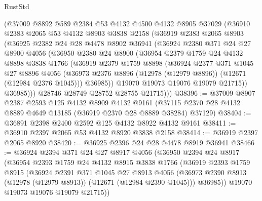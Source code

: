 \begin{lexlean}{RustStd}
\begin{coremodule}
      (@37009
        @8892
        @589
        @2384
        @53
        @4132
        @4500
        @4132
        @8905
        @37029
        (@36910
          @2383
          @2065
          @53
          @4132
          @8903
          @3838
          @2158
          (@36919
            @2383
            @2065
            @8903
            (@36925
              @2382
              @24
              @28
              @4478
              @8902
              @36941
              (@36924
                @2380
                @371
                @24
                @27
                @8900
                @4056
                (@36950
                  @2380
                  @24
                  @8900
                  (@36954
                    @2379
                    @1759
                    @24
                    @4132
                    @8898
                    @3838
                    @1766
                    (@36919
                      @2379
                      @1759
                      @8898
                      (@36924
                        @2377
                        @371
                        @1045
                        @27
                        @8896
                        @4056
                        (@36973 @2376 @8896 (@12978 (@12979 @8896)) (@12671 (@12984 @2376 @1045)))
                        @36985))
                    @19070
                    @19073
                    @19076
                    @19079
                    @21715))
                @36985)))
          @28746
          @28749
          @28752
          @28755
          @21715)))
@38396 := @37009
    @8907
    @2387
    @2593
    @125
    @4132
    @8909
    @4132
    @9161
    (@37115 @2370 @28 @4132 @8889 @4649 @13185 (@36919 @2370 @28 @8889 @38284) @37129)
@38404 := @36891 @2398 @2400 @2592 @125 @4132 @8922 @4132 @9161
@38411 := @36910 @2397 @2065 @53 @4132 @8920 @3838 @2158
@38414 := @36919 @2397 @2065 @8920
@38420 := @36925 @2396 @24 @28 @4478 @8919 @36941
@38466 := @36924
    @2394
    @371
    @24
    @27
    @8917
    @4056
    (@36950
      @2394
      @24
      @8917
      (@36954
        @2393
        @1759
        @24
        @4132
        @8915
        @3838
        @1766
        (@36919
          @2393
          @1759
          @8915
          (@36924
            @2391
            @371
            @1045
            @27
            @8913
            @4056
            (@36973 @2390 @8913 (@12978 (@12979 @8913)) (@12671 (@12984 @2390 @1045)))
            @36985))
        @19070
        @19073
        @19076
        @19079
        @21715))

\end{coremodule}
\end{lexlean}
